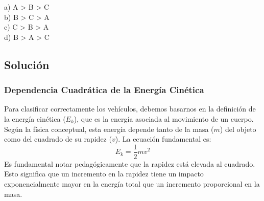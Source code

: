 \documentclass[a4paper,12pt]{article}
\begin{document}
\begin{center}
\shorthandoff{>}
\end{center}

a) A > B > C\\
b) B > C > A\\
c) C > B > A\\
d) B > A > C

\subsection*{Solución}

\subsubsection*{Dependencia Cuadrática de la Energía Cinética}
Para clasificar correctamente los vehículos, debemos basarnos en la definición de la energía cinética ($E_k$), que es la energía asociada al movimiento de un cuerpo. Según la física conceptual, esta energía depende tanto de la masa ($m$) del objeto como del cuadrado de su rapidez ($v$). La ecuación fundamental es:
$$E_k = \frac{1}{2} m v^2$$
Es fundamental notar pedagógicamente que la rapidez está elevada al cuadrado. Esto significa que un incremento en la rapidez tiene un impacto exponencialmente mayor en la energía total que un incremento proporcional en la masa. 
\end{document}
